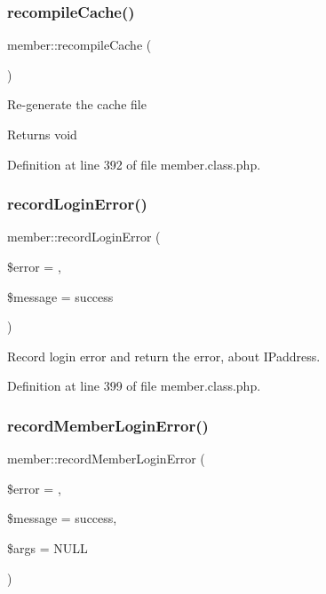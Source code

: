 \subsubsection{\texorpdfstring{recompile\+Cache()}{recompileCache()}}
{\footnotesize\ttfamily member\+::recompile\+Cache (\begin{DoxyParamCaption}{ }\end{DoxyParamCaption})}

Re-\/generate the cache file

\begin{DoxyReturn}{Returns}
void 
\end{DoxyReturn}


Definition at line 392 of file member.\+class.\+php.

\hypertarget{classmember_ac7aa72e76a771976a3aaae4baf31477d}{}\label{classmember_ac7aa72e76a771976a3aaae4baf31477d} 
\subsubsection{\texorpdfstring{record\+Login\+Error()}{recordLoginError()}}
{\footnotesize\ttfamily member\+::record\+Login\+Error (\begin{DoxyParamCaption}\item[{}]{\$error = {},  }\item[{}]{\$message = {\ttfamily \textquotesingle{}success\textquotesingle{}} }\end{DoxyParamCaption})}



Record login error and return the error, about I\+Paddress. 



Definition at line 399 of file member.\+class.\+php.

\hypertarget{classmember_ad43b5bae89e7d46d2498f853c10414cb}{}\label{classmember_ad43b5bae89e7d46d2498f853c10414cb} 
\subsubsection{\texorpdfstring{record\+Member\+Login\+Error()}{recordMemberLoginError()}}
{\footnotesize\ttfamily member\+::record\+Member\+Login\+Error (\begin{DoxyParamCaption}\item[{}]{\$error = {},  }\item[{}]{\$message = {\ttfamily \textquotesingle{}success\textquotesingle{}},  }\item[{}]{\$args = {\ttfamily NULL} }\end{DoxyParamCaption})}



